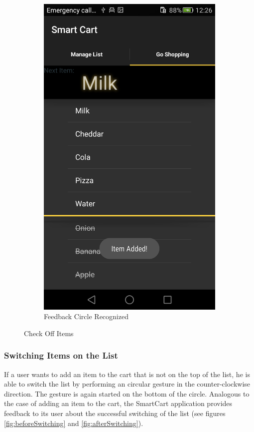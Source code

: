 \begin{figure}[h]
\begin{subfigure}{0.475\textwidth}
\centering 
\includegraphics[height= 0.3\textheight]{res/usermanual/circleRecognized.png}
\caption{Feedback Circle Recognized}
\label{fig:feedbackCircle}
\end{subfigure}
\caption{Check Off Items}
\label{fig:checkItems}
\end{figure}

\subsubsection{Switching Items on the List}
If a user wants to add an item to the cart that is not on the top of the list,
he is able to switch the list by performing an circular gesture in the
counter-clockwise direction. The gesture is again started on the bottom of the
circle. Analogous to the case of adding an item to the cart, the SmartCart
application provides feedback to its user about the successful switching of the
list (see figures \ref{fig:beforeSwitching} and \ref{fig:afterSwitching}).

